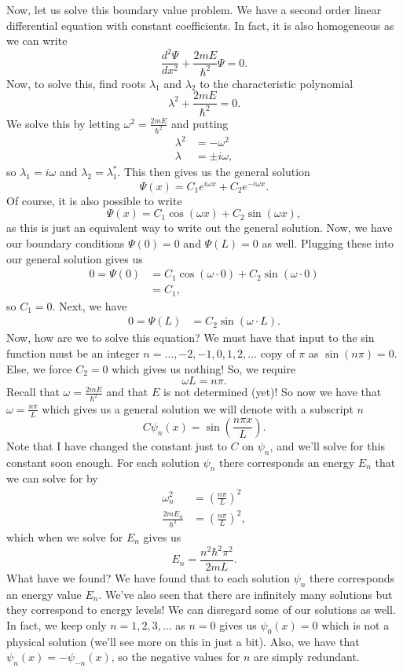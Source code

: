 Now, let us solve this boundary value problem.  We have a second order linear differential equation with constant coefficients. In fact, it is also homogeneous as we can write
\[
\frac{d^2\Psi}{dx^2}+\frac{2mE}{\hbar^2}\Psi =0.
\]
Now, to solve this, find roots $\lambda_1$ and $\lambda_2$ to the characteristic polynomial
\[
\lambda^2+\frac{2mE}{\hbar^2}=0.
\]
We solve this by letting $\omega^2 = \frac{2mE}{\hbar^2}$ and putting
\begin{align*}
    \lambda^2&=-\omega^2\\
    \lambda&=\pm i \omega,
\end{align*}
so $\lambda_1=i\omega$ and $\lambda_2=\lambda_1^*$. This then gives us the general solution
\[
\Psi(x)=C_1 e^{i\omega x}+C_2 e^{-i\omega x}.
\]
Of course, it is also possible to write
\[
\Psi(x)=C_1\cos(\omega x)+C_2\sin(\omega x),
\]
as this is just an equivalent way to write out the general solution. Now, we have our boundary conditions $\Psi(0)=0$ and $\Psi(L)=0$ as well.  Plugging these into our general solution gives us
\begin{align*}
    0=\Psi(0)&=C_1 \cos(\omega \cdot 0)+C_2 \sin(\omega \cdot 0)\\
    &= C_1,
\end{align*}
so $C_1=0$.  Next, we have
\begin{align*}
    0=\Psi(L)&=C_2\sin(\omega \cdot L).
\end{align*}
Now, how are we to solve this equation? We must have that input to the sin function must be an integer $n=\dots,-2,-1,0,1,2,\dots$ copy of $\pi$ as $\sin(n\pi)=0$. Else, we force $C_2=0$ which gives us nothing!  So, we require
\[
\omega L = n\pi.
\]
Recall that $\omega = \frac{2mE}{\hbar^2}$ and that $E$ is not determined (yet)! So now we have that $\omega = \frac{n\pi}{L}$ which gives us a general solution we will denote with a subscript $n$
\[
C\psi_n(x)=\sin\left(\frac{n\pi x}{L}\right).
\]
Note that I have changed the constant just to $C$ on $\psi_n$, and we'll solve for this constant soon enough.  For each solution $\psi_n$ there corresponds an energy $E_n$ that we can solve for by
\begin{align*}
    \omega_n^2  &= \left(\frac{n \pi}{L}\right)^2\\
    \frac{2mE_n}{\hbar^2}&= \left(\frac{n\pi}{L}\right)^2,
\end{align*}
which when we solve for $E_n$ gives us
\[
   \boxed{E_n = \frac{n^2\hbar^2\pi^2}{2mL}.}
\]
What have we found? We have found that to each solution $\psi_n$ there corresponds an energy value $E_n$. We've also seen that there are infinitely many solutions but they correspond to  energy levels! We can disregard some of our solutions as well. In fact, we keep only $n=1,2,3,\dots$ as $n=0$ gives us $\psi_0(x)=0$ which is not a physical solution (we'll see more on this in just a bit).  Also, we have that $\psi_n(x)=-\psi_{-n}(x)$, so the negative values for $n$ are simply redundant.

